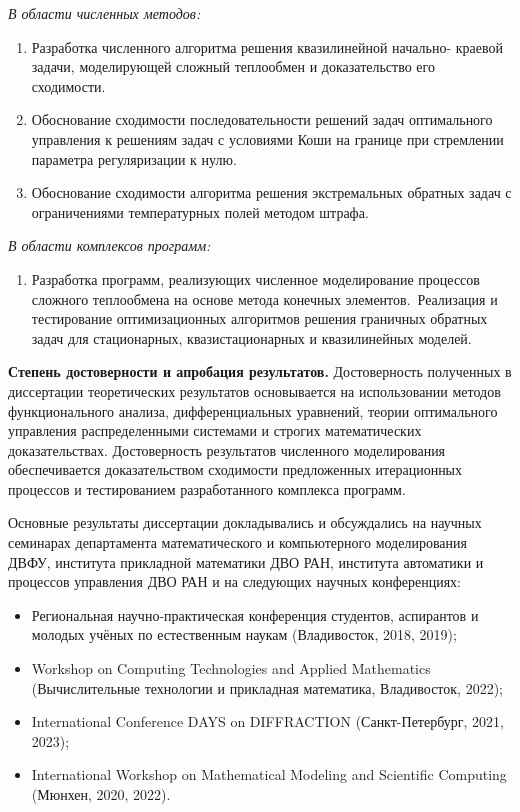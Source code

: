    \textit{В области численных методов:}

    \begin{enumerate}[leftmargin=5.5mm]
        \setcounter{enumi}{\value{nameOfYourChoice}}
        \item Разработка численного алгоритма решения квазилинейной начально-
        краевой задачи, моделирующей сложный теплообмен и доказательство его
        сходимости.
        \item Обоснование сходимости последовательности решений задач
        оптимального управления к решениям задач с условиями Коши на границе
        при стремлении параметра регуляризации к нулю.
        \item Обоснование сходимости алгоритма решения экстремальных обратных
        задач с ограничениями температурных полей методом штрафа.
        \setcounter{nameOfYourChoice}{\value{enumi}}
    \end{enumerate}

    \textit{В области комплексов программ:}

    \begin{enumerate}[leftmargin=5.5mm]
        \setcounter{enumi}{\value{nameOfYourChoice}}
        \item Разработка программ, реализующих численное моделирование процессов
        сложного теплообмена на основе метода конечных элементов.\ Реализация и
        тестирование оптимизационных алгоритмов решения граничных обратных
        задач для стационарных, квазистационарных и квазилинейных моделей.
    \end{enumerate}


    \textbf{Степень достоверности и апробация результатов.}
    Достоверность полученных в диссертации теоретических результатов основывается на
    использовании методов функционального анализа, дифференциальных
    уравнений, теории оптимального управления распределенными системами
    и строгих математических доказательствах.
    Достоверность результатов численного моделирования обеспечивается
    доказательством сходимости предложенных итерационных процессов
    и тестированием разработанного комплекса программ.

    Основные результаты диссертации докладывались и обсуждались на
    научных семинарах департамента математического и компьютерного моделирования
    ДВФУ, института прикладной математики ДВО РАН, института автоматики
    и процессов управления ДВО РАН и на следующих научных конференциях:
    \begin{itemize}[leftmargin=5.5mm]
        \item Региональная научно-практическая конференция студентов, аспирантов
        и молодых учёных по естественным наукам (Владивосток, 2018, 2019);
        \item Workshop on Computing Technologies and Applied Mathematics
        (Вычислительные технологии и прикладная математика, Владивосток, 2022);
        \item International Conference DAYS on DIFFRACTION (Санкт-Петербург, 2021, 2023);
        \item International Workshop on Mathematical Modeling and Scientific Computing (Мюнхен, 2020, 2022).
    \end{itemize}

